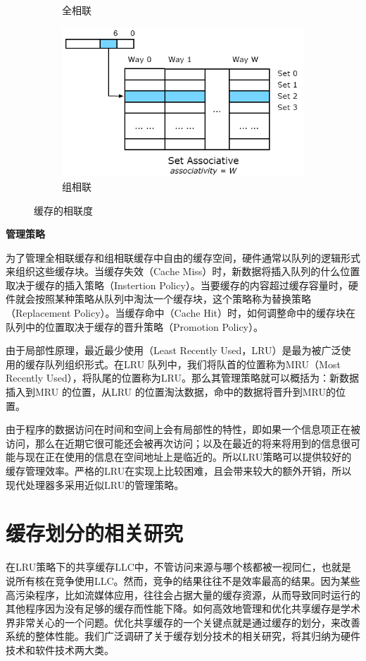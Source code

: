 \begin{figure}[htbp]
\begin{subfigure}[b]{0.24\linewidth}
        \caption{全相联}
    \end{subfigure}%
    \begin{subfigure}[b]{0.52\linewidth}
        \centering\includegraphics[width=0.9\linewidth]{figures/CacheAsso3.png}
        \caption{组相联}
    \end{subfigure}
    \caption{缓存的相联度}
    \label{fig:cache_asso}
\end{figure}

\textbf{管理策略}

为了管理全相联缓存和组相联缓存中自由的缓存空间，硬件通常以队列的逻辑形式来组织这些缓存块。当缓存失效（Cache Miss）时，新数据将插入队列的什么位置取决于缓存的插入策略（Instertion Policy）。当要缓存的内容超过缓存容量时，硬件就会按照某种策略从队列中淘汰一个缓存块，这个策略称为替换策略（Replacement Policy）。当缓存命中（Cache Hit）时，如何调整命中的缓存块在队列中的位置取决于缓存的晋升策略（Promotion Policy）。

由于局部性原理，最近最少使用（Least Recently Used，LRU）是最为被广泛使用的缓存队列组织形式。在LRU 队列中，我们将队首的位置称为MRU（Most Recently Used），将队尾的位置称为LRU。那么其管理策略就可以概括为：新数据插入到MRU 的位置，从LRU 的位置淘汰数据，命中的数据将晋升到MRU的位置。

由于程序的数据访问在时间和空间上会有局部性的特性，即如果一个信息项正在被访问，那么在近期它很可能还会被再次访问；以及在最近的将来将用到的信息很可能与现在正在使用的信息在空间地址上是临近的。所以LRU策略可以提供较好的缓存管理效率。严格的LRU在实现上比较困难，且会带来较大的额外开销，所以现代处理器多采用近似LRU的管理策略。

\section{缓存划分的相关研究}
在LRU策略下的共享缓存LLC中，不管访问来源与哪个核都被一视同仁，也就是说所有核在竞争使用LLC。然而，竞争的结果往往不是效率最高的结果。因为某些高污染程序，比如流媒体应用，往往会占据大量的缓存资源，从而导致同时运行的其他程序因为没有足够的缓存而性能下降。如何高效地管理和优化共享缓存是学术界非常关心的一个问题。优化共享缓存的一个关键点就是通过缓存的划分，来改善系统的整体性能。我们广泛调研了关于缓存划分技术的相关研究，将其归纳为硬件技术和软件技术两大类。

